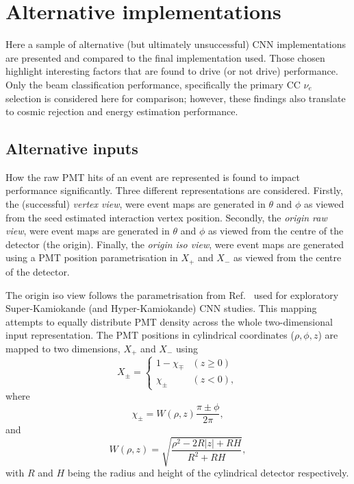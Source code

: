 \section{Alternative implementations} %
\label{sec:results_alt} %

Here a sample of alternative (but ultimately unsuccessful) \chips CNN implementations are
presented and compared to the final implementation used. Those chosen highlight interesting
factors that are found to drive (or not drive) performance. Only the beam classification
performance, specifically the primary CC $\nu_{e}$ selection is considered here for comparison;
however, these findings also translate to cosmic rejection and energy estimation performance.

\subsection{Alternative inputs} %
\label{sec:results_alt_inputs} %

How the raw PMT hits of an event are represented is found to impact performance significantly.
Three different representations are considered. Firstly, the (successful) \emph{vertex view}, were
event maps are generated in $\theta$ and $\phi$ as viewed from the seed estimated interaction
vertex position. Secondly, the \emph{origin raw view}, were event maps are generated in $\theta$
and $\phi$ as viewed from the centre of the detector (the origin). Finally, the \emph{origin iso
view}, were event maps are generated using a PMT position parametrisation in $X_{+}$ and $X_{-}$
as viewed from the centre of the detector.

The origin iso view follows the parametrisation from Ref.~\cite{berns2020} used for exploratory
Super-Kamiokande (and Hyper-Kamiokande) CNN studies. This mapping attempts to equally distribute
PMT density across the whole two-dimensional input representation. The PMT positions in
cylindrical coordinates ($\rho,\phi,z$) are mapped to two dimensions, $X_{+}$ and $X_{-}$ using
\begin{equation} %
    X_{\pm}=
    \begin{cases}
        1-\chi_{\mp} & (z \geq 0) \\
        \chi_{\pm}   & (z < 0),
    \end{cases}
    \label{eq:iso_case}
\end{equation}
where
\begin{equation} %
    \chi_{\pm}=W(\rho,z)\frac{\pi\pm\phi}{2\pi},
    \label{eq:iso_main}
\end{equation}
and
\begin{equation} %
    W(\rho,z)=\sqrt{\frac{\rho^{2}-2R|z|+RH}{R^{2}+RH}},
    \label{eq:iso_part}
\end{equation}
with $R$ and $H$ being the radius and height of the cylindrical detector respectively.

